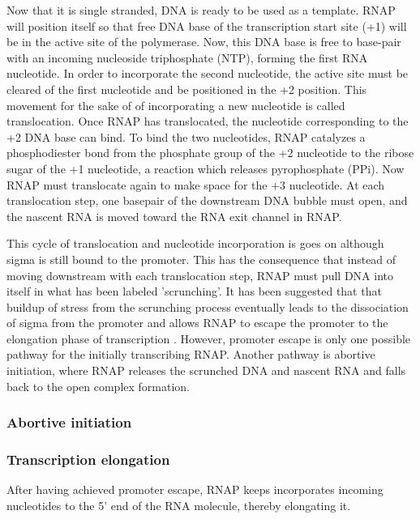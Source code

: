 Now that it is single stranded, DNA is ready to be used as a template. RNAP
will position itself so that free DNA base of the transcription start site (+1)
will be in the active site of the polymerase. Now, this DNA base is free to
base-pair with an incoming nucleoside triphosphate (NTP), forming the first RNA
nucleotide. In order to incorporate the second nucleotide, the active site must
be cleared of the first nucleotide and be positioned in the +2 position. This movement
for the sake of of incorporating a new nucleotide is called translocation. Once
RNAP has translocated, the nucleotide corresponding to the +2 DNA base can
bind. To bind the two nucleotides, RNAP catalyzes a phosphodiester bond from
the phosphate group of the +2 nucleotide to the ribose sugar of the +1
nucleotide, a reaction which releases pyrophosphate (PPi). Now RNAP must
translocate again to make space for the +3 nucleotide. At each translocation
step, one basepair of the downstream DNA bubble must open, and the nascent RNA
is moved toward the RNA exit channel in RNAP.

This cycle of translocation and nucleotide incorporation is goes on although
sigma is still bound to the promoter. This has the consequence that instead of
moving downstream with each translocation step, RNAP must pull DNA into itself
in what has been labeled 'scrunching'. It has been suggested that that buildup
of stress from the scrunching process eventually leads to the dissociation of
sigma from the promoter and allows RNAP to escape the promoter to the
elongation phase of transcription \cite{revyakin_abortive_2006}. However,
promoter escape is only one possible pathway for the initially transcribing
RNAP. Another pathway is abortive initiation, where RNAP releases the scrunched
DNA and nascent RNA and falls back to the open complex formation.

\subsubsection{Abortive initiation}

\subsubsection{Transcription elongation}
After having achieved promoter escape, RNAP keeps incorporates incoming
nucleotides to the 5' end of the RNA molecule, thereby elongating it.

